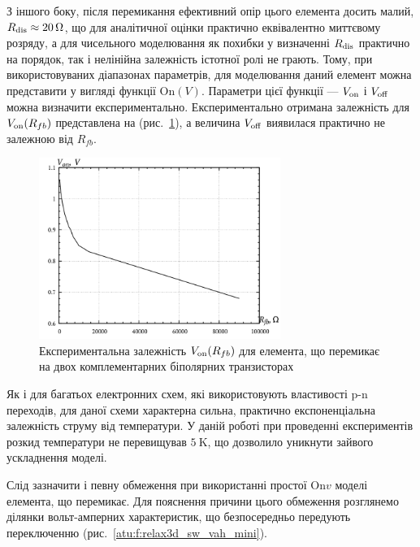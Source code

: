 З іншого боку, після перемикання ефективний опір цього елемента досить малий,
$ R _\mathrm{dis} \approx \SI{20}{\ohm} $, що для аналітичної оцінки практично
еквівалентно миттєвому розряду, а для чисельного моделювання
як похибки у визначенні
$ R _\mathrm{dis} $ практично на порядок, так і нелінійна залежність
істотної ролі не грають. Тому, при використовуваних діапазонах
параметрів, для моделювання даний елемент можна представити
у вигляді функції
$ \mathrm{On} (V) $. Параметри цієї функції ---
$ V _\mathrm{on} $ і
$ V _\mathrm{off} $ можна визначити експериментально. Експериментально
отримана залежність для
$ V _\mathrm{on} (R_{fb}) $ представлена на (рис.~\ref{atu:f:relax3d_bjt_v_onn}), а
величина
$ V _\mathrm{off} $ виявилася практично не залежною від
$ R_{fb} $.

\begin{figure}[htb!]
  \centerline{\includegraphics[width=0.7\textwidth]{p/r_fb-V_on.png} }
\caption{Експериментальна залежність $ V _\mathrm{on} (R_{fb}) $ для елемента, що перемикає на двох комплементарних біполярних транзисторах}
\label{atu:f:relax3d_bjt_v_onn}
\end{figure}

Як і для багатьох електронних схем, які використовують
властивості p-n переходів, для даної схеми характерна сильна,
практично експоненціальна залежність струму від температури. У
даній роботі при проведенні експериментів розкид температури
не перевищував
$ \SI{5}{\kelvin} $, що дозволило уникнути зайвого ускладнення моделі.


Слід зазначити і певну обмеження при використанні простої
$ \mathrm{On}{v} $ моделі елемента, що перемикає. Для пояснення
причини цього обмеження розглянемо ділянки вольт-амперних
характеристик, що безпосередньо передують переключенню
(рис.~\ref{atu:f:relax3d_sw_vah_mini}).

